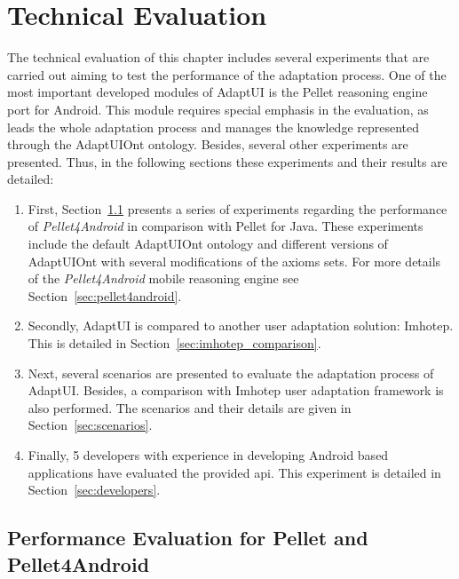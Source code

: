 \section{Technical Evaluation}
\label{sec:technical_evaluation}

The technical evaluation of this chapter includes several experiments that are 
carried out aiming to test the performance of the adaptation process. One of 
the most important developed modules of AdaptUI is the Pellet reasoning 
engine port for Android. This module requires special emphasis in the evaluation, 
as leads the whole adaptation process and manages the knowledge represented 
through the AdaptUIOnt ontology. Besides, several other experiments are 
presented. Thus, in the following sections these experiments and their results 
are detailed:


\begin{enumerate}[label=\alph*)]
  \item First, Section~\ref{sec:performance_evaluation} presents a series 
  of experiments regarding the performance of \textit{Pellet4Android} in 
  comparison with Pellet for Java. These experiments include the default
  AdaptUIOnt ontology and different versions of AdaptUIOnt with several modifications
  of the axioms sets. For more details of the \textit{Pellet4Android} mobile 
  reasoning engine see Section~\ref{sec:pellet4android}.
  
  \item Secondly, AdaptUI is compared to another user adaptation solution: 
  Imhotep. This is detailed in Section~\ref{sec:imhotep_comparison}.
  
  \item Next, several scenarios are presented to evaluate the adaptation 
  process of AdaptUI. Besides, a comparison with Imhotep user adaptation 
  framework is also performed. The scenarios and their details are given in 
  Section~\ref{sec:scenarios}.
  
  \item Finally, 5 developers with experience in developing Android based 
  applications have evaluated the provided \acs{api}. This experiment is detailed
  in Section~\ref{sec:developers}.
\end{enumerate}


\subsection{Performance Evaluation for Pellet and Pellet4Android}
\label{sec:performance_evaluation}

